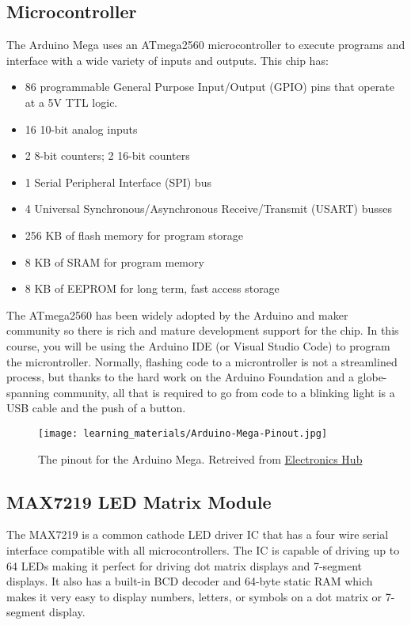     \subsection*{Microcontroller}
    The Arduino Mega uses an ATmega2560 microcontroller to execute programs and interface with a wide variety of inputs and outputs.
    This chip has:
    \begin{itemize}
        \item 86 programmable General Purpose Input/Output (GPIO) pins that operate at a 5V TTL logic.
        \item 16 10-bit analog inputs
        \item 2 8-bit counters; 2 16-bit counters
        \item 1 Serial Peripheral Interface (SPI) bus
        \item 4 Universal Synchronous/Asynchronous Receive/Transmit (USART) busses
        \item 256 KB of flash memory for program storage
        \item 8 KB of SRAM for program memory
        \item 8 KB of EEPROM for long term, fast access storage
    \end{itemize}

    The ATmega2560 has been widely adopted by the Arduino and maker community so there is rich and mature development support for the chip.
    In this course, you will be using the Arduino IDE (or Visual Studio Code) to program the microntroller. 
    Normally, flashing code to a microntroller is not a streamlined process, but thanks to the hard work on the Arduino Foundation and a globe-spanning community, all that is required to go from code to a blinking light is a USB cable and the push of a button.

    \begin{figure*}[h!]
        \texttt{[image: learning\_materials/Arduino-Mega-Pinout.jpg]}
        \caption[Arduino Mega Pinout]{The pinout for the Arduino Mega. Retreived from \href{https://www.electronicshub.org/wp-content/uploads/2021/01/Arduino-Mega-Pinout.jpg}{Electronics Hub}}
    \end{figure*}

    \pagebreak %
    \subsection*{MAX7219 LED Matrix Module}
    The MAX7219 is a common cathode LED driver IC that has a four wire serial interface compatible with all microcontrollers.
    The IC is capable of driving up to 64 LEDs making it perfect for driving dot matrix displays and 7-segment displays.
    It also has a built-in BCD decoder and 64-byte static RAM which makes it very easy to display numbers, letters, or symbols on a dot matrix or 7-segment display.

